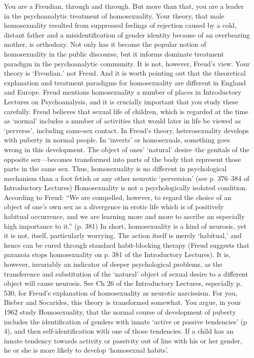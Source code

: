 You are a Freudian, through and through. But more than that, you are a leader in the psychoanalytic treatment of homosexuality. Your theory, that male homosexuality resulted from suppressed feelings of rejection caused by a cold, distant father and a misidentification of gender identity because of an overbearing mother, is orthodoxy. Not only has it become the popular notion of homosexuality in the public discourse, but it informs dominate treatment paradigm in the psychoanalytic community.
It is not, however, Freud's view. Your theory is `Freudian,' not Freud. And it is worth pointing out that the theoretical explanation and treatment paradigms for homosexuality are different in England and Europe.
Freud mentions homosexuality a number of places in Introductory Lectures on Psychoanalysis, and it is crucially important that you study these carefully. Freud believes that sexual life of children, which is regarded at the time as `normal' includes a number of activities that would later in life be viewed as `perverse', including same-sex contact. In Freud's theory, heterosexuality develops with puberty in normal people. In `inverts' or homosexuals, something goes wrong in this development. The object of ones' `natural' desire--the genitals of the opposite sex—becomes transformed into parts of the body that represent those parts in the same sex. Thus, homosexuality is no different in psychological mechanism than a foot fetish or any other neurotic `perversion' (see p. 376--384 of Introductory Lectures) Homosexuality is not a psychologically isolated condition. According to Freud:
“We are compelled, however, to regard the choice of an object of one's own sex as a divergence in erotic life which is of positively habitual occurrence, and we are learning more and more to ascribe an especially high importance to it.” (p. 381)
In short, homosexuality is a kind of neurosis, yet it is not, itself, particularly worrying. The action itself is merely `habitual,' and hence can be cured through standard habit-blocking therapy (Freud suggests that paranoia stops homosexuality on p. 381 of the Introductory Lectures). It is, however, invariably an indicator of deeper psychological problems, as the transference and substitution of the `natural' object of sexual desire to a different object will cause neurosis. See Ch 26 of the Introductory Lectures, especially p. 530, for Freud's explanation of homosexuality as neurotic narcissism.
For you, Bieber and Socarides, this theory is transformed somewhat. You argue, in your 1962 study Homosexuality, that the normal course of development of puberty includes the identification of genders with innate `active or passive tendencies' (p 4), and then self-identification with one of those tendencies. If a child has an innate tendency towards activity or passivity out of line with his or her gender, he or she is more likely to develop `homosexual habits'.
